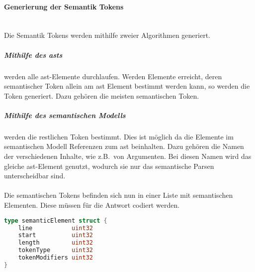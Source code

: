 \documentclass[./einleitung.tex]{subfiles}
\begin{document}
    \paragraph{Generierung der Semantik Tokens}\mbox{}\\
    Die Semantik Tokens werden mithilfe zweier Algorithmen generiert.
    \subparagraph{Mithilfe des \acrshort{ast}s} werden alle \acrshort{ast}-Elemente durchlaufen.
    Werden Elemente erreicht, deren semantischer Token allein am \acrshort{ast} Element bestimmt werden kann, so werden die Token generiert.
    Dazu gehören die meisten semantischen Token.
    \subparagraph{Mithilfe des semantischen Modells} werden die restlichen Token bestimmt.
    Dies ist möglich da die Elemente im semantischen Modell Referenzen zum \acrshort{ast} beinhalten.
    Dazu gehören die Namen der verschiedenen Inhalte, wie z.B.\ von Argumenten.
    Bei diesen Namen wird das gleiche \acrshort{ast}-Element genutzt, wodurch sie nur das semantische Parsen unterscheidbar sind.
    \\\\
    Die semantischen Tokens befinden sich nun in einer Liste mit semantischen Elementen.
    Diese müssen für die Antwort codiert werden.
    \begin{lstlisting}[language=Go, caption=semantisches Element, label=lst:semantic-element]
type semanticElement struct {
	line           uint32
	start          uint32
	length         uint32
	tokenType      uint32
	tokenModifiers uint32
}
    \end{lstlisting}
\end{document}
